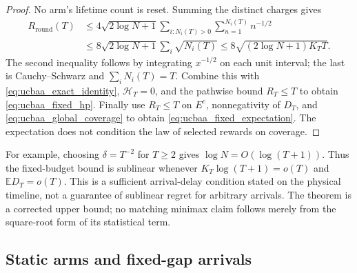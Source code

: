 \begin{proof}
No arm's lifetime count is reset. Summing the distinct charges gives
\begin{align*}
 R_{\mathrm{round}}(T)
 &\le4\sqrt{2\log N+1}
       \sum_{i:N_i(T)>0}\sum_{n=1}^{N_i(T)}n^{-1/2}\\
 &\le8\sqrt{2\log N+1}\sum_i\sqrt{N_i(T)}
 \le8\sqrt{(2\log N+1)K_TT}.
\end{align*}
The second inequality follows by integrating $x^{-1/2}$ on each unit
interval; the last is Cauchy--Schwarz and $\sum_iN_i(T)=T$.
Combine this with \eqref{eq:ucbaa_exact_identity}, $\mathcal H_T=0$, and the
pathwise bound $R_T\le T$ to obtain \eqref{eq:ucbaa_fixed_hp}.
Finally use $R_T\le T$ on $E^c$, nonnegativity of $D_T$, and
\eqref{eq:ucbaa_global_coverage} to obtain
\eqref{eq:ucbaa_fixed_expectation}. The expectation does not condition
the law of selected rewards on coverage.
\end{proof}

For example, choosing $\delta=T^{-2}$ for $T\ge2$ gives
$\log N=O(\log(T+1))$. Thus the fixed-budget bound is sublinear whenever
$K_T\log(T+1)=o(T)$ and $\mathbb E D_T=o(T)$.
This is a sufficient arrival-delay condition stated on the physical
timeline, not a guarantee of sublinear regret for arbitrary arrivals.
The theorem is a corrected upper bound; no matching minimax claim follows
merely from the square-root form of its statistical term.

\subsection{Static arms and fixed-gap arrivals}

